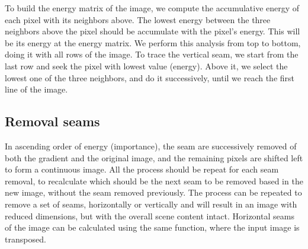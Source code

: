 \documentclass{article}
\begin{document}
	To build the energy matrix of the image, we compute the accumulative energy of each pixel with its neighbors above. The lowest energy between the three neighbors above the pixel should be accumulate with the pixel's energy. This will be its energy at the energy matrix. We perform this analysis from top to bottom, doing it with all rows of the image. To trace the vertical seam, we start from the last row and seek the pixel with lowest value (energy). Above it, we select the lowest one of the three neighbors, and do it successively, until we reach the first line of the image.
	\subsection{Removal seams}
	In ascending order of energy (importance), the seam are successively removed of both the gradient and the original image, and the remaining pixels are shifted left to form a continuous image. All the process should be repeat for each seam removal, to recalculate which should be the next seam to be removed based in the new image, without the seam removed previously. The process can be repeated to remove a set of seams, horizontally or vertically and will result in an image with reduced dimensions, but with the overall scene content intact. Horizontal seams of the image can be calculated using the same function, where the input image is transposed.

{}

\end{document}
